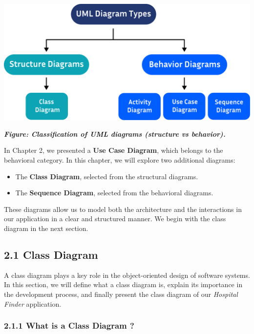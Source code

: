 \documentclass[12pt]{report}
\begin{document}
\begin{center}
	\vspace{1.5cm}
	\hspace{1cm}
	\includegraphics[width=14cm]{images/diagramType.pdf}

\end{center}
\begin{center}
	\textit{\textbf{Figure: Classification of UML diagrams (structure vs behavior).}}
\end{center}
\vspace{0.5cm}
\noindent In Chapter 2, we presented a \textbf{Use Case Diagram}, which belongs to the behavioral category. In this chapter, we will explore two additional diagrams:
\begin{itemize}
	\item The \textbf{Class Diagram}, selected from the structural diagrams.
	\item The \textbf{Sequence Diagram}, selected from the behavioral diagrams.
\end{itemize}

\noindent These diagrams allow us to model both the architecture and the interactions in our application in a clear and structured manner. We begin with the class diagram in the next section.

\subsection*{2.1 Class Diagram}

A class diagram plays a key role in the object-oriented design of software systems. In this section, we will define what a class diagram is, explain its importance in the development process, and finally present the class diagram of our \textit{Hospital Finder} application.

\subsubsection*{2.1.1 What is a Class Diagram ?}
\vspace{0.1cm}
\end{document}
